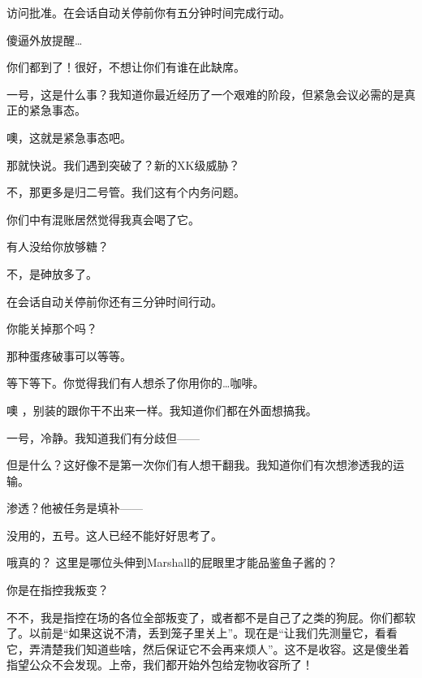 \begin{scpbox}


访问批准。在会话自动关停前你有五分钟时间完成行动。

\ii{{[}自言自语]} 傻逼外放提醒…


你们都到了！很好，不想让你们有谁在此缺席。

一号，这是什么事？我知道你最近经历了一个艰难的阶段，但紧急会议必需的是真正的紧急事态。

噢，这就是紧急事态吧。

那就快说。我们遇到突破了？新的XK级威胁？

不，那更多是归二号管。我们这有个内务问题。


你们中有混账居然觉得我真会喝了它。

有人没给你放够糖？

不，是砷放多了。

在会话自动关停前你还有三分钟时间行动。

\ii{{[}指向电脑]} 你能关掉那个吗？

那种蛋疼破事可以等等。

等下等下。你觉得我们有人想杀了你用你的…咖啡。

噢 ，别装的跟你干不出来一样。我知道你们都在外面想搞我。

一号，冷静。我知道我们有分歧但——

但是什么？这好像不是第一次你们有人想干翻我。我知道你们有次想渗透我的运输。

渗透？他被任务是填补——

没用的，五号。这人已经不能好好思考了。

哦真的？ 这里是哪位头伸到Marshall的屁眼里才能品鉴鱼子酱的？

你是在指控我叛变？

不不，我是指控在场的各位全部叛变了，或者都不是自己了之类的狗屁。你们都软了。以前是“如果这说不清，丢到笼子里关上”。现在是“让我们先测量它，看看它，弄清楚我们知道些啥，然后保证它不会再来烦人”。这不是收容。这是傻坐着指望公众不会发现。上帝，我们都开始外包给宠物收容所了！


\end{scpbox}
